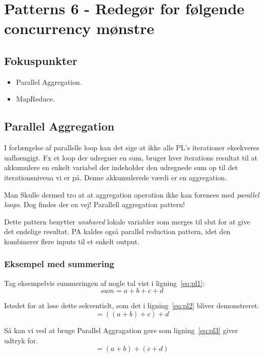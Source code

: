 \section{Patterns 6 - Redegør for følgende concurrency mønstre}

\subsection{Fokuspunkter}

\begin{itemize}
	\item Parallel Aggregation.
	\item MapReduce.
\end{itemize}

\subsection{Parallel Aggregation}
I forlængelse af parallelle loop kan det sige at ikke alle PL's iterationer eksekveres uafhængigt. Fx et loop der udregner en sum, bruger hver iterations resultat til at akkumulere en enkelt variabel der indeholder den udregnede sum op til det iterationsniveua vi er på. Denne akkumulerede værdi er en aggregation.

Man Skulle dermed tro at at aggregation operation ikke kan forenees med \textit{parallel loops}. Dog findes der en vej! Parallell aggregation pattern!

Dette pattern benytter \textit{unshared} lokale variabler som merges til slut for at give det endelige resultat. PA kaldes også parallel reduction pattern, idet den kombinerer flere inputs til et enkelt output.\\

\subsubsection{Eksempel med summering}
Tag eksempelvis summeringen af nogle tal vist i ligning~\ref{eq:pl1}:
\begin{equation}\label{eq:pl1}
sum = a + b + c + d
\end{equation}

Istedet for at løse dette sekventielt, som det i ligning~\ref{eq:pl2} bliver demonstreret. 
\begin{equation}\label{eq:pl2}
=((a + b) + c) + d
\end{equation}

Så kan vi ved at bruge Parallel Aggragation gøre som ligning~\ref{eq:pl3} giver udtryk for.
\begin{equation}\label{eq:pl3}
=(a + b) + (c + d)
\end{equation}

